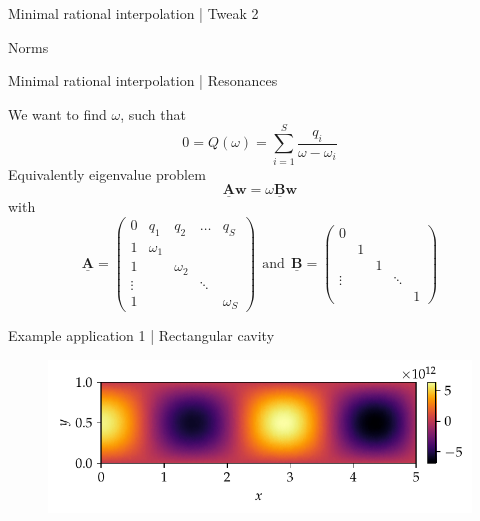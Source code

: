 \documentclass{beamer}
\begin{document}
\begin{frame}{Minimal rational interpolation | Tweak 2}
    
    Norms

\end{frame}

\begin{frame}{Minimal rational interpolation | Resonances}

    We want to find $\omega$, such that
    \begin{equation*}
        0 = Q(\omega) = \sum_{i=1}^S \frac{q_i}{\omega - \omega_i}
    \end{equation*}
    Equivalently eigenvalue problem
    \begin{equation*}
        \mathbf{\underline{A}} \mathbf{w} = \omega \mathbf{\underline{B}} \mathbf{w}
    \end{equation*}
    with
    \begin{equation*}
        \mathbf{\underline{A}} = \begin{pmatrix}
            0 & q_1 & q_2 & \dots & q_S \\
            1 & \omega_1 & & & \\
            1 & & \omega_2 & & \\
            \vdots & & & \ddots & \\
            1 & & & & \omega_S
        \end{pmatrix} ~~\text{and}~~
        \mathbf{\underline{B}} = \begin{pmatrix}
            0 & & & & \\
            & 1 & & & \\
            & & 1 & & \\ 
            \vdots & & & \ddots & \\ 
            & & & & 1
        \end{pmatrix}
    \end{equation*}

\end{frame}

\begin{frame}{Example application 1 | Rectangular cavity}

    \begin{figure}
        \centering
        \scalebox{0.9}{}
    \end{figure}
    \vspace{-45pt}
    \begin{figure}
        \centering
        \includegraphics[scale=0.9]{../report/plots/rectangular_cavity_mode1.pdf}
    \end{figure}

\end{frame}
\end{document}
